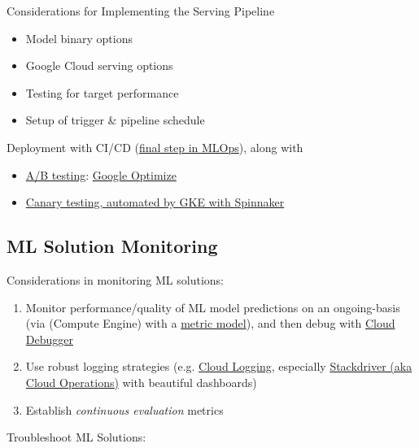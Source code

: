 \documentclass[10pt,landscape,letterpaper]{cheatsheet}
\begin{document}
\begin{multicols}{3}
Considerations for Implementing the Serving Pipeline

\begin{itemize}
    \item Model binary options
    \item Google Cloud serving options
    \item Testing for target performance
    \item Setup of trigger \& pipeline schedule
\end{itemize}

Deployment with CI/CD (\href{https://cloud.google.com/solutions/machine-learning/mlops-continuous-delivery-and-automation-pipelines-in-machine-learning#mlops_level_2_cicd_pipeline_automation}{final step in MLOps}), along with 

\begin{itemize}
    \item \href{https://cloud.google.com/recommendations-ai/docs/a-b-testing}{A/B testing}: \href{https://optimize.withgoogle.com/}{Google Optimize}
    \item \href{https://cloud.google.com/solutions/automated-canary-analysis-kubernetes-engine-spinnaker}{Canary testing, automated by GKE with Spinnaker}
\end{itemize}

\subsection{ML Solution Monitoring}

Considerations in monitoring ML solutions:

\begin{enumerate}
    \item Monitor performance/quality of ML model predictions on an ongoing-basis (via  (Compute Engine) with a \href{https://cloud.google.com/monitoring/api/v3/metric-model}{metric model}), and then debug with \href{https://cloud.google.com/debugger}{Cloud Debugger}
    \item Use robust logging strategies (e.g. \href{https://cloud.google.com/logging}{Cloud Logging}, especially \href{https://cloud.google.com/products/operations}{Stackdriver (aka Cloud Operations)} with beautiful dashboards)
    \item Establish \textit{continuous evaluation} metrics
\end{enumerate}

Troubleshoot ML Solutions:


\end{multicols}
\end{document}
